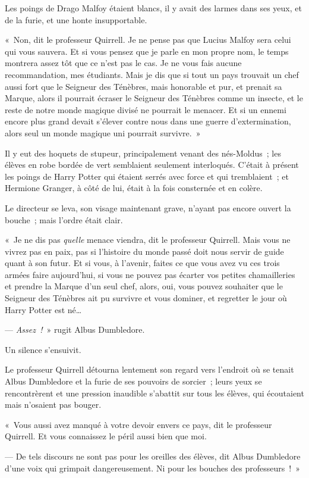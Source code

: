 Les poings de Drago Malfoy étaient blancs, il y avait des larmes dans ses yeux, et de la furie, et une honte insupportable.

«~Non, dit le professeur Quirrell. Je ne pense pas que Lucius Malfoy sera celui qui vous sauvera. Et si vous pensez que je parle en mon propre nom, le temps montrera assez tôt que ce n'est pas le cas. Je ne vous fais aucune recommandation, mes étudiants. Mais je dis que si tout un pays trouvait un chef aussi fort que le Seigneur des Ténèbres, mais honorable et pur, et prenait sa Marque, alors il pourrait écraser le Seigneur des Ténèbres comme un insecte, et le reste de notre monde magique divisé ne pourrait le menacer. Et si un ennemi encore plus grand devait s'élever contre nous dans une guerre d'extermination, alors seul un monde magique uni pourrait survivre.~»

Il y eut des hoquets de stupeur, principalement venant des nés-Moldus~; les élèves en robe bordée de vert semblaient seulement interloqués. C'était à présent les poings de Harry Potter qui étaient serrés avec force et qui tremblaient~; et Hermione Granger, à côté de lui, était à la fois consternée et en colère.

Le directeur se leva, son visage maintenant grave, n'ayant pas encore ouvert la bouche~; mais l'ordre était clair.

«~Je ne dis pas \emph{quelle} menace viendra, dit le professeur Quirrell. Mais vous ne vivrez pas en paix, pas si l'histoire du monde passé doit nous servir de guide quant à son futur. Et si vous, à l'avenir, faites ce que vous avez vu ces trois armées faire aujourd'hui, si vous ne pouvez pas écarter vos petites chamailleries et prendre la Marque d'un seul chef, alors, oui, vous pouvez souhaiter que le Seigneur des Ténèbres ait pu survivre et vous dominer, et regretter le jour où Harry Potter est né…

--- \emph{Assez~!}~» rugit Albus Dumbledore.

Un silence s'ensuivit.

Le professeur Quirrell détourna lentement son regard vers l'endroit où se tenait Albus Dumbledore et la furie de ses pouvoirs de sorcier~; leurs yeux se rencontrèrent et une pression inaudible s'abattit sur tous les élèves, qui écoutaient mais n'osaient pas bouger.

«~Vous aussi avez manqué à votre devoir envers ce pays, dit le professeur Quirrell. Et vous connaissez le péril aussi bien que moi.

--- De tels discours ne sont pas pour les oreilles des élèves, dit Albus Dumbledore d'une voix qui grimpait dangereusement. Ni pour les bouches des professeurs~!~»

